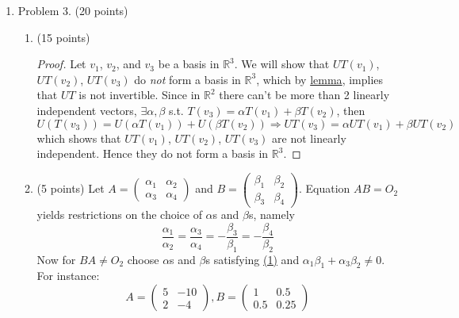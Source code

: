 \documentclass[]{book}
\theoremstyle{definition}
\newcommand{\0}{\mathbf{0}}
\begin{document}
\begin{enumerate}
\item Problem 3. (20 points)
\begin{enumerate}
    \item (15 points)
    \begin{proof}
    Let $v_1$, $v_2$, and $v_3$ be a basis in $\mathbb{R}^3$. We will show that $UT(v_1)$, $UT(v_2)$, $UT(v_3)$ do \emph{not} form a basis in $\mathbb{R}^3$, which by \hyperref[lemma]{lemma}, implies that $UT$ is not invertible.\smallbreak
    Since in $\mathbb{R}^2$ there can't be more than 2 linearly independent vectors, $\exists\alpha,\beta$ s.t. $T(v_3)=\alpha T(v_1)+\beta T(v_2)$, then
    \[U(T(v_3))=U(\alpha T(v_1))+U(\beta T(v_2))\Rightarrow UT(v_3)=\alpha UT(v_1)+\beta UT(v_2)\]
    which shows that $UT(v_1)$, $UT(v_2)$, $UT(v_3)$ are not linearly independent. Hence they do not form a basis in $\mathbb{R}^3$.
    \end{proof}
    \item (5 points)
    Let $A=\begin{pmatrix}
    \alpha_1 & \alpha_2\\
    \alpha_3 & \alpha_4
    \end{pmatrix}$ and $B=\begin{pmatrix}
    \beta_1 & \beta_2\\
    \beta_3 & \beta_4
    \end{pmatrix}$.\newline
    Equation $AB=O_2$ yields restrictions on the choice of $\alpha$s and $\beta$s, namely
    \begin{equation}\label{(1)}
    \frac{\alpha_1}{\alpha_2}=\frac{\alpha_3}{\alpha_4}=-\frac{\beta_3}{\beta_1}=-\frac{\beta_4}{\beta_2}
    \end{equation}
    Now for $BA\neq O_2$ choose $\alpha$s and $\beta$s satisfying \hyperref[(1)]{(1)} and $\alpha_1\beta_1+\alpha_3\beta_2\neq 0$. For instance:
    \[A=\begin{pmatrix}
    5 & -10\\
    2 & -4
    \end{pmatrix},B=\begin{pmatrix}
    1 & 0.5\\
    0.5 & 0.25
    \end{pmatrix}\]
\end{enumerate}


\end{enumerate}
\end{document}

